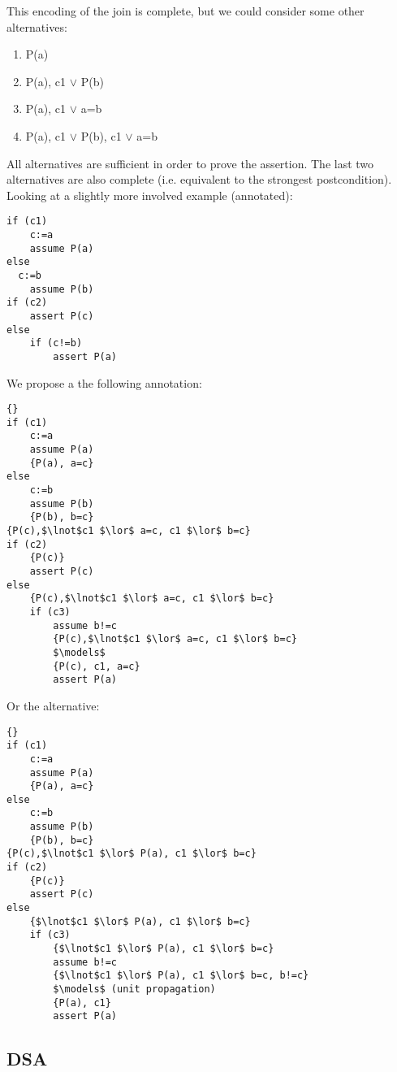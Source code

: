 This encoding of the join is complete, but we could consider some other alternatives:
\begin{enumerate}
	\item {P(a)}
	\item {P(a), c1 $\lor$ P(b)}
	\item {P(a), c1 $\lor$ a=b}
	\item {P(a), c1 $\lor$ P(b), c1 $\lor$ a=b}
\end{enumerate}

All alternatives are sufficient in order to prove the assertion.
The last two alternatives are also complete (i.e. equivalent to the strongest postcondition).
Looking at a slightly more involved example (annotated):
\begin{lstlisting}[caption=Hoare scoping join 2,label=snippet3.5.5]
if (c1)
	c:=a
	assume P(a)
else
  c:=b
	assume P(b)
if (c2)
	assert P(c)
else
	if (c!=b)
		assert P(a)
\end{lstlisting}

We propose a the following annotation:
\begin{lstlisting}[caption=Hoare scoping join 2,label=snippet3.5.5a]
{}
if (c1)
	c:=a
	assume P(a)
	{P(a), a=c}
else
	c:=b
	assume P(b)
	{P(b), b=c}
{P(c),$\lnot$c1 $\lor$ a=c, c1 $\lor$ b=c}
if (c2)
	{P(c)}
	assert P(c)
else
	{P(c),$\lnot$c1 $\lor$ a=c, c1 $\lor$ b=c}
	if (c3)
		assume b!=c
		{P(c),$\lnot$c1 $\lor$ a=c, c1 $\lor$ b=c}
		$\models$
		{P(c), c1, a=c}
		assert P(a)
\end{lstlisting}

Or the alternative:
\begin{lstlisting}[caption=Hoare scoping join 2,label=snippet3.5.5b]
{}
if (c1)
	c:=a
	assume P(a)
	{P(a), a=c}
else
	c:=b
	assume P(b)
	{P(b), b=c}
{P(c),$\lnot$c1 $\lor$ P(a), c1 $\lor$ b=c}
if (c2)
	{P(c)}
	assert P(c)
else
	{$\lnot$c1 $\lor$ P(a), c1 $\lor$ b=c}
	if (c3)
		{$\lnot$c1 $\lor$ P(a), c1 $\lor$ b=c}
		assume b!=c
		{$\lnot$c1 $\lor$ P(a), c1 $\lor$ b=c, b!=c}
		$\models$ (unit propagation)
		{P(a), c1}
		assert P(a)
\end{lstlisting}


\subsection{DSA}

